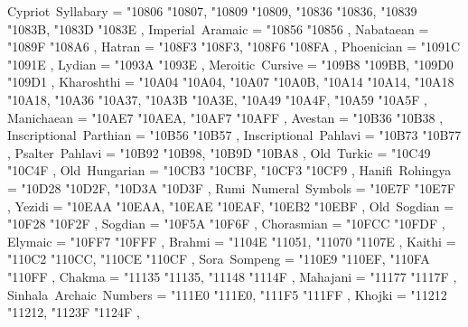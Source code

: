 {    Cypriot~Syllabary                              = { {"10806} {"10807}, {"10809} {"10809}, {"10836} {"10836}, {"10839} {"1083B}, {"1083D} {"1083E} },
    Imperial~Aramaic                               = { {"10856} {"10856} },
    Nabataean                                      = { {"1089F} {"108A6} },
    Hatran                                         = { {"108F3} {"108F3}, {"108F6} {"108FA} },
    Phoenician                                     = { {"1091C} {"1091E} },
    Lydian                                         = { {"1093A} {"1093E} },
    Meroitic~Cursive                               = { {"109B8} {"109BB}, {"109D0} {"109D1} },
    Kharoshthi                                     = { {"10A04} {"10A04}, {"10A07} {"10A0B}, {"10A14} {"10A14}, {"10A18} {"10A18}, {"10A36} {"10A37}, {"10A3B} {"10A3E}, {"10A49} {"10A4F}, {"10A59} {"10A5F} },
    Manichaean                                     = { {"10AE7} {"10AEA}, {"10AF7} {"10AFF} },
    Avestan                                        = { {"10B36} {"10B38} },
    Inscriptional~Parthian                         = { {"10B56} {"10B57} },
    Inscriptional~Pahlavi                          = { {"10B73} {"10B77} },
    Psalter~Pahlavi                                = { {"10B92} {"10B98}, {"10B9D} {"10BA8} },
    Old~Turkic                                     = { {"10C49} {"10C4F} },
    Old~Hungarian                                  = { {"10CB3} {"10CBF}, {"10CF3} {"10CF9} },
    Hanifi~Rohingya                                = { {"10D28} {"10D2F}, {"10D3A} {"10D3F} },
    Rumi~Numeral~Symbols                           = { {"10E7F} {"10E7F} },
    Yezidi                                         = { {"10EAA} {"10EAA}, {"10EAE} {"10EAF}, {"10EB2} {"10EBF} },
    Old~Sogdian                                    = { {"10F28} {"10F2F} },
    Sogdian                                        = { {"10F5A} {"10F6F} },
    Chorasmian                                     = { {"10FCC} {"10FDF} },
    Elymaic                                        = { {"10FF7} {"10FFF} },
    Brahmi                                         = { {"1104E} {"11051}, {"11070} {"1107E} },
    Kaithi                                         = { {"110C2} {"110CC}, {"110CE} {"110CF} },
    Sora~Sompeng                                   = { {"110E9} {"110EF}, {"110FA} {"110FF} },
    Chakma                                         = { {"11135} {"11135}, {"11148} {"1114F} },
    Mahajani                                       = { {"11177} {"1117F} },
    Sinhala~Archaic~Numbers                        = { {"111E0} {"111E0}, {"111F5} {"111FF} },
    Khojki                                         = { {"11212} {"11212}, {"1123F} {"1124F} },
}
